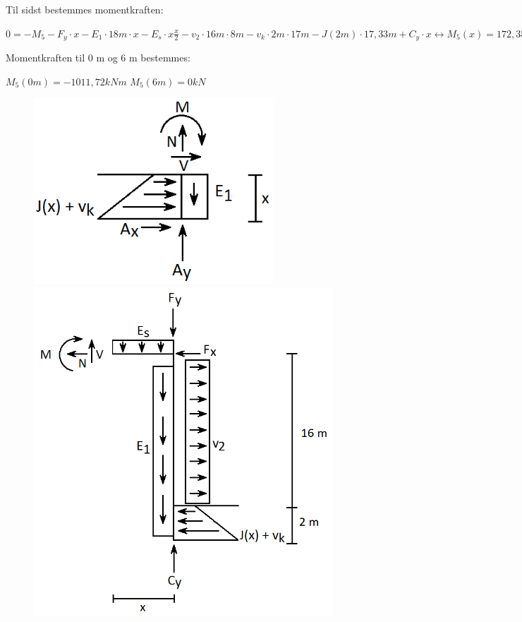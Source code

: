 Til sidst bestemmes momentkraften:
\begin{center}
	$0 = -M_5 - F_y \cdot x - E_1 \cdot 18 m \cdot x - E_s \cdot x \frac{x}{2} - v_2 \cdot 16 m \cdot 8 m - v_k \cdot 2 m \cdot 17 m - J(2m) \cdot 17,\!33 m + C_y \cdot x \leftrightarrow M_5(x) = 172,\!35 kN \cdot x - 0,\!62 \frac{kN}{m} \cdot x^2 -1011,\!72 kNm$
\end{center}

Momentkraften til 0 m og 6 m bestemmes:
\begin{center}
	$M_5(0m) = -1011,\!72 kNm$
	\newline
	$M_5(6m) = 0 kN$
\end{center}

\begin{figure}[H]\centering
	\begin{minipage}[b]{0.48\textwidth}\centering
		\includegraphics[width=0.80\textwidth]{billeder/snitet.png} %
	\end{minipage}\hfill
	\begin{minipage}[b]{0.48\textwidth}\centering
		\includegraphics[width=1.0\textwidth]{billeder/snitfem.png} %

\end{minipage}
\end{figure}

